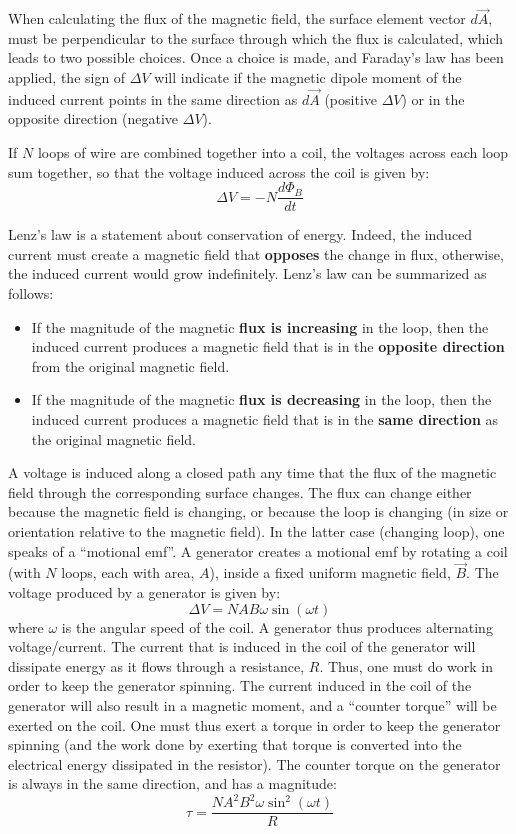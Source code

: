 When calculating the flux of the magnetic field, the surface element vector $d\vec A$, must be perpendicular to the surface through which the flux is calculated, which leads to two possible choices. Once a choice is made, and Faraday's law has been applied, the sign of $\Delta V$ will indicate if the magnetic dipole moment of the induced current points in the same direction as $d\vec A$ (positive $\Delta V$) or in the opposite direction (negative $\Delta V$).

If $N$ loops of wire are combined together into a coil, the voltages across each loop sum together, so that the voltage induced across the coil is given by:
\begin{equation}
\Delta V = -N\frac{d\Phi_B}{dt}
\end{equation}

Lenz's law is a statement about conservation of energy. Indeed, the induced current must create a magnetic field that \textbf{opposes} the change in flux, otherwise, the induced current would grow indefinitely. Lenz's law can be summarized as follows:

\begin{itemize}
\item If the magnitude of the magnetic \textbf{flux is increasing} in the loop, then the induced current produces a magnetic field that is in the \textbf{opposite direction} from the original magnetic field.
\item If the magnitude of the magnetic \textbf{flux is decreasing} in the loop, then the induced current produces a magnetic field that is in the \textbf{same direction} as the original magnetic field.
\end{itemize}

A voltage is induced along a closed path any time that the flux of the magnetic field through the corresponding surface changes. The flux can change either because the magnetic field is changing, or because the loop is changing (in size or orientation relative to the magnetic field). In the latter case (changing loop), one speaks of a ``motional emf''. A generator creates a motional emf by rotating a coil (with $N$ loops, each with area, $A$), inside a fixed uniform magnetic field, $\vec B$. The voltage produced by a generator is given by:
\begin{equation}
\Delta V = NAB\omega\sin(\omega t)
\end{equation}
where $\omega$ is the angular speed of the coil. A generator thus produces alternating voltage/current. The current that is induced in the coil of the generator will dissipate energy as it flows through a resistance, $R$. Thus, one must do work in order to keep the generator spinning. The current induced in the coil of the generator will also result in a magnetic moment, and a ``counter torque'' will be exerted on the coil. One must thus exert a torque in order to keep the generator spinning (and the work done by exerting that torque is converted into the electrical energy dissipated in the resistor). The counter torque on the generator is always in the same direction, and has a magnitude:
\begin{equation}
\tau = \frac{NA^2B^2\omega\sin^2(\omega t)}{R}
\end{equation}

